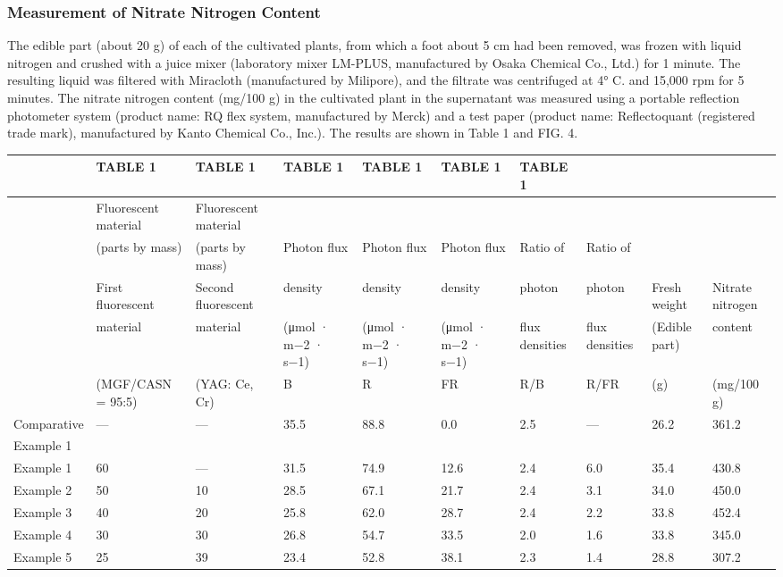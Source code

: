 \documentclass[11pt,a4paper]{article}
\begin{document}
\subsubsection{Measurement of Nitrate Nitrogen Content}

The edible part (about 20 g) of each of the cultivated plants, from which a foot about 5 cm had been removed, was frozen with liquid nitrogen and crushed with a juice mixer (laboratory mixer LM-PLUS, manufactured by Osaka Chemical Co., Ltd.) for 1 minute. The resulting liquid was filtered with Miracloth (manufactured by Milipore), and the filtrate was centrifuged at 4° C. and 15,000 rpm for 5 minutes. The nitrate nitrogen content (mg/100 g) in the cultivated plant in the supernatant was measured using a portable reflection photometer system (product name: RQ flex system, manufactured by Merck) and a test paper (product name: Reflectoquant (registered trade mark), manufactured by Kanto Chemical Co., Inc.). The results are shown in Table 1 and FIG. 4.

\begin{table}[h]
\begin{tabular}{|l|l|l|l|l|l|l|l|l|l|}
\hline
 & TABLE 1 & TABLE 1 & TABLE 1 & TABLE 1 & TABLE 1 & TABLE 1 &  &  &  \\ \hline
 & Fluorescent material & Fluorescent material &  &  &  &  &  &  &  \\ \hline
 & (parts by mass) & (parts by mass) & Photon flux & Photon flux & Photon flux & Ratio of & Ratio of &  &  \\ \hline
 & First fluorescent & Second fluorescent & density & density & density & photon & photon & Fresh weight & Nitrate nitrogen \\ \hline
 & material & material & (μmol · m−2 · s−1) & (μmol · m−2 · s−1) & (μmol · m−2 · s−1) & flux densities & flux densities & (Edible part) & content \\ \hline
 & (MGF/CASN = 95:5) & (YAG: Ce, Cr) & B & R & FR & R/B & R/FR & (g) & (mg/100 g) \\ \hline
Comparative & — & — & 35.5 & 88.8 & 0.0 & 2.5 & — & 26.2 & 361.2 \\ \hline
Example 1 &  &  &  &  &  &  &  &  &  \\ \hline
Example 1 & 60 & — & 31.5 & 74.9 & 12.6 & 2.4 & 6.0 & 35.4 & 430.8 \\ \hline
Example 2 & 50 & 10 & 28.5 & 67.1 & 21.7 & 2.4 & 3.1 & 34.0 & 450.0 \\ \hline
Example 3 & 40 & 20 & 25.8 & 62.0 & 28.7 & 2.4 & 2.2 & 33.8 & 452.4 \\ \hline
Example 4 & 30 & 30 & 26.8 & 54.7 & 33.5 & 2.0 & 1.6 & 33.8 & 345.0 \\ \hline
Example 5 & 25 & 39 & 23.4 & 52.8 & 38.1 & 2.3 & 1.4 & 28.8 & 307.2 \\ \hline
\end{tabular}
\end{table}
\end{document}
